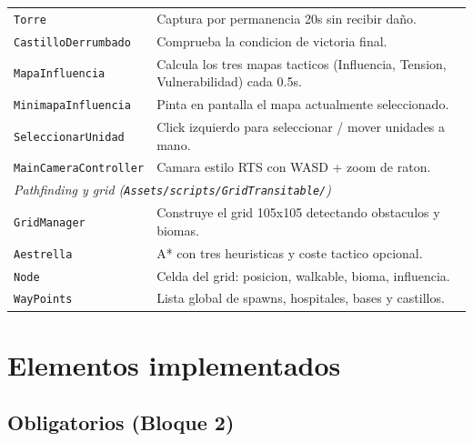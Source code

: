 \documentclass[12pt,a4paper]{article}
\begin{document}
\begin{table}[H]
\begin{tabularx}{\textwidth}{l X}
\texttt{Torre} & Captura por permanencia 20s sin recibir daño. \\
\texttt{CastilloDerrumbado} & Comprueba la condicion de victoria final. \\
\texttt{MapaInfluencia} & Calcula los tres mapas tacticos (Influencia, Tension, Vulnerabilidad) cada 0.5s. \\
\texttt{MinimapaInfluencia} & Pinta en pantalla el mapa actualmente seleccionado. \\
\texttt{SeleccionarUnidad} & Click izquierdo para seleccionar / mover unidades a mano. \\
\texttt{MainCameraController} & Camara estilo RTS con WASD + zoom de raton. \\
\midrule
\multicolumn{2}{l}{\textit{Pathfinding y grid (\texttt{Assets/scripts/GridTransitable/})}} \\
\texttt{GridManager} & Construye el grid 105x105 detectando obstaculos y biomas. \\
\texttt{Aestrella} & A* con tres heuristicas y coste tactico opcional. \\
\texttt{Node} & Celda del grid: posicion, walkable, bioma, influencia. \\
\texttt{WayPoints} & Lista global de spawns, hospitales, bases y castillos. \\
\bottomrule
\end{tabularx}
\end{table}

\section{Elementos implementados}

\subsection{Obligatorios (Bloque 2)}
\end{document}
